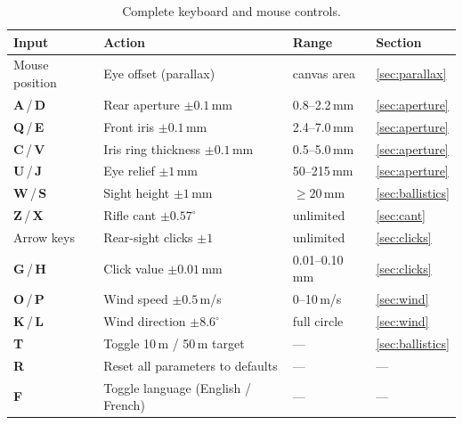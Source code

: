 \documentclass[11pt]{article}
\newcommand{\key}[1]{\textsf{\textbf{#1}}}
\begin{document}
\begin{table}[H]
\centering\small
\begin{tabular}{@{}llll@{}}
\toprule
\textbf{Input}       & \textbf{Action}
                      & \textbf{Range}
                      & \textbf{Section} \\
\midrule
Mouse position        & Eye offset (parallax)
                      & canvas area
                      & \cref{sec:parallax} \\
\key{A}\,/\,\key{D}  & Rear aperture $\pm 0.1$\,mm
                      & 0.8--2.2\,mm
                      & \cref{sec:aperture} \\
\key{Q}\,/\,\key{E}  & Front iris $\pm 0.1$\,mm
                      & 2.4--7.0\,mm
                      & \cref{sec:aperture} \\
\key{C}\,/\,\key{V}  & Iris ring thickness $\pm 0.1$\,mm
                      & 0.5--5.0\,mm
                      & \cref{sec:aperture} \\
\key{U}\,/\,\key{J}  & Eye relief $\pm 1$\,mm
                      & 50--215\,mm
                      & \cref{sec:aperture} \\
\key{W}\,/\,\key{S}  & Sight height $\pm 1$\,mm
                      & $\geq 20$\,mm
                      & \cref{sec:ballistics} \\
\key{Z}\,/\,\key{X}  & Rifle cant $\pm 0.57^{\circ}$
                      & unlimited
                      & \cref{sec:cant} \\
Arrow keys            & Rear-sight clicks $\pm 1$
                      & unlimited
                      & \cref{sec:clicks} \\
\key{G}\,/\,\key{H}  & Click value $\pm 0.01$\,mm
                      & 0.01--0.10\,mm
                      & \cref{sec:clicks} \\
\key{O}\,/\,\key{P}  & Wind speed $\pm 0.5$\,m/s
                      & 0--10\,m/s
                      & \cref{sec:wind} \\
\key{K}\,/\,\key{L}  & Wind direction $\pm 8.6^{\circ}$
                      & full circle
                      & \cref{sec:wind} \\
\key{T}              & Toggle 10\,m / 50\,m target
                      & ---
                      & \cref{sec:ballistics} \\
\key{R}              & Reset all parameters to defaults
                      & ---
                      & --- \\
\key{F}              & Toggle language (English / French)
                      & ---
                      & --- \\
\bottomrule
\end{tabular}
\caption{Complete keyboard and mouse controls.}\label{tab:controls}
\end{table}
\end{document}
